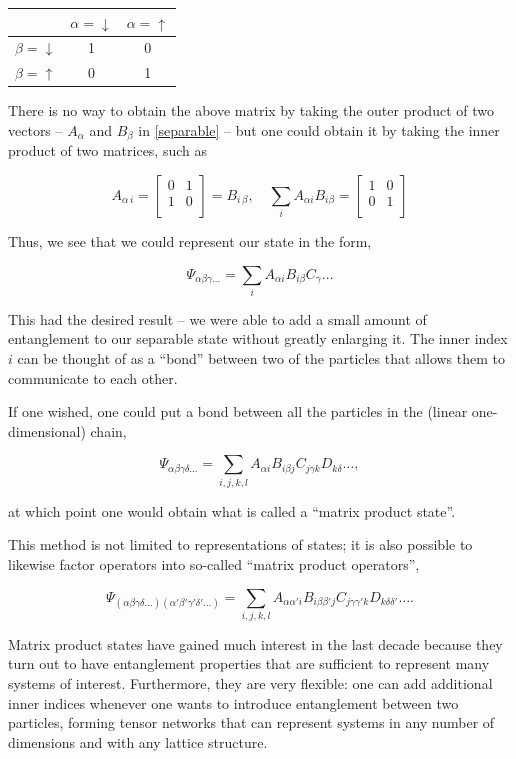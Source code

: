 \documentclass{amsbook}
\theoremstyle{plain}
\theoremstyle{definition}
\theoremstyle{remark}
\newcommand{\bmat}[4]{
\begin{bmatrix}
#1 & #2\\
#3 & #4\\
\end{bmatrix}
}
\newcommand{\eqn}[2][]{\begin{equation}\label{#1}#2\end{equation}}
\begin{document}
\begin{center}
\begin{tabular}{c||c|c}
               & $\alpha=\downarrow$ & $\alpha=\uparrow$ \\
\hline
\hline
$\beta=\downarrow$ &       1        &       0      \\
\hline
$\beta=\uparrow$   &       0        &       1
\end{tabular}
\end{center}

There is no way to obtain the above matrix by taking the outer product of two vectors -- $A_\alpha$ and $B_\beta$ in \eqref{separable} -- but one could obtain it by taking the inner product of two matrices, such as

$$A_{\alpha\,i} = \bmat{0}{1}{1}{0} = B_{i\,\beta}, \quad \sum_i A_{\alpha i} B_{i \beta} = \bmat{1}{0}{0}{1} $$

Thus, we see that we could represent our state in the form,

$$\Psi_{\alpha\beta\gamma\dots} = \sum_i A_{\alpha i} B_{i\beta} C_\gamma \dots$$

This had the desired result -- we were able to add a small amount of entanglement to our separable state without greatly enlarging it.  The inner index $i$ can be thought of as a ``bond'' between two of the particles that allows them to communicate to each other.

If one wished, one could put a bond between all the particles in the (linear one-dimensional) chain,

\eqn[mps-oldnotation]{\Psi_{\alpha\beta\gamma\delta\dots} = \sum_{i,j,k,l} A_{\alpha i} B_{i \beta j} C_{j \gamma k} D_{k \delta} \dots,}

\noindent at which point one would obtain what is called a ``matrix product state''.

This method is not limited to representations of states; it is also possible to likewise factor operators into so-called ``matrix product operators'',

$$\Psi_{(\alpha\beta\gamma\delta\dots)(\alpha'\beta'\gamma'\delta'\dots)} = \sum_{i,j,k,l} A_{\alpha\alpha' i} B_{i\beta\beta'j} C_{j\gamma\gamma'k} D_{k \delta\delta'} \dots.$$

Matrix product states have gained much interest in the last decade because they turn out to have entanglement properties that are sufficient to represent many systems of interest.  Furthermore, they are very flexible:  one can add additional inner indices whenever one wants to introduce entanglement between two particles, forming tensor networks that can represent systems in any number of dimensions and with any lattice structure.
\end{document}
